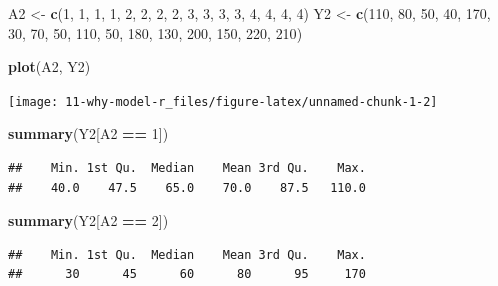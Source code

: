 \documentclass[
  10pt,
]{book}
\newenvironment{Shaded}{\begin{snugshade}}{\end{snugshade}}
\newcommand{\DecValTok}[1]{\textcolor[rgb]{0.00,0.00,0.81}{#1}}
\newcommand{\KeywordTok}[1]{\textcolor[rgb]{0.13,0.29,0.53}{\textbf{#1}}}
\newcommand{\NormalTok}[1]{#1}
\newcommand{\OperatorTok}[1]{\textcolor[rgb]{0.81,0.36,0.00}{\textbf{#1}}}
\newcommand{\StringTok}[1]{\textcolor[rgb]{0.31,0.60,0.02}{#1}}
\begin{document}
\begin{Shaded}
\begin{Highlighting}[]
\NormalTok{A2 <-}\StringTok{ }\KeywordTok{c}\NormalTok{(}\DecValTok{1}\NormalTok{, }\DecValTok{1}\NormalTok{, }\DecValTok{1}\NormalTok{, }\DecValTok{1}\NormalTok{, }\DecValTok{2}\NormalTok{, }\DecValTok{2}\NormalTok{, }\DecValTok{2}\NormalTok{, }\DecValTok{2}\NormalTok{, }\DecValTok{3}\NormalTok{, }\DecValTok{3}\NormalTok{, }\DecValTok{3}\NormalTok{, }\DecValTok{3}\NormalTok{, }\DecValTok{4}\NormalTok{, }\DecValTok{4}\NormalTok{, }\DecValTok{4}\NormalTok{, }\DecValTok{4}\NormalTok{)}
\NormalTok{Y2 <-}\StringTok{ }\KeywordTok{c}\NormalTok{(}\DecValTok{110}\NormalTok{, }\DecValTok{80}\NormalTok{, }\DecValTok{50}\NormalTok{, }\DecValTok{40}\NormalTok{, }\DecValTok{170}\NormalTok{, }\DecValTok{30}\NormalTok{, }\DecValTok{70}\NormalTok{, }\DecValTok{50}\NormalTok{, }\DecValTok{110}\NormalTok{, }\DecValTok{50}\NormalTok{, }\DecValTok{180}\NormalTok{,}
        \DecValTok{130}\NormalTok{, }\DecValTok{200}\NormalTok{, }\DecValTok{150}\NormalTok{, }\DecValTok{220}\NormalTok{, }\DecValTok{210}\NormalTok{)}

\KeywordTok{plot}\NormalTok{(A2, Y2)}
\end{Highlighting}
\end{Shaded}

\begin{center}\texttt{[image: 11-why-model-r\_files/figure-latex/unnamed-chunk-1-2]} \end{center}

\begin{Shaded}
\begin{Highlighting}[]
\KeywordTok{summary}\NormalTok{(Y2[A2 }\OperatorTok{==}\StringTok{ }\DecValTok{1}\NormalTok{])}
\end{Highlighting}
\end{Shaded}

\begin{verbatim}
##    Min. 1st Qu.  Median    Mean 3rd Qu.    Max. 
##    40.0    47.5    65.0    70.0    87.5   110.0
\end{verbatim}

\begin{Shaded}
\begin{Highlighting}[]
\KeywordTok{summary}\NormalTok{(Y2[A2 }\OperatorTok{==}\StringTok{ }\DecValTok{2}\NormalTok{])}
\end{Highlighting}
\end{Shaded}

\begin{verbatim}
##    Min. 1st Qu.  Median    Mean 3rd Qu.    Max. 
##      30      45      60      80      95     170
\end{verbatim}
\end{document}
